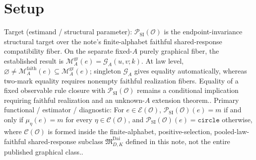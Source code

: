 \documentclass{article}
\begin{document}
\section{Setup}

Target (estimand / structural parameter): \(\mathcal P_{\mathrm{SI}}(\mathcal O)\) is the endpoint-invariance structural target over the note's finite-alphabet faithful shared-response compatibility fiber. On the separate fixed-\(A\) purely graphical fiber, the established result is \(\mathcal M_A^{\mathrm{gr}}(e)=\mathcal G_A(u,v;k)\). At law level, \(\varnothing\ne\mathcal M_A^{\mathrm{faith}}(e)\subseteq\mathcal M_A^{\mathrm{gr}}(e)\); singleton \(\mathcal G_A\) gives equality automatically, whereas two-mark equality requires nonempty faithful realization fibers. Equality of a fixed observable rule closure with \(\mathcal P_{\mathrm{SI}}(\mathcal O)\) remains a conditional implication requiring faithful realization and an unknown-\(A\) extension theorem..
Primary functional / estimator / diagnostic: For \(e\in\mathcal E(\mathcal O)\), \(\mathcal P_{\mathrm{SI}}(\mathcal O)(e)=m\) if and only if \(\mu_\eta(e)=m\) for every \(\eta\in\mathcal C(\mathcal O)\), and \(\mathcal P_{\mathrm{SI}}(\mathcal O)(e)=\mathtt{circle}\) otherwise, where \(\mathcal C(\mathcal O)\) is formed inside the finite-alphabet, positive-selection, pooled-law-faithful shared-response subclass \(\mathfrak M_{D,K}^{\mathrm{Dai}}\) defined in this note, not the entire published graphical class..
\end{document}
